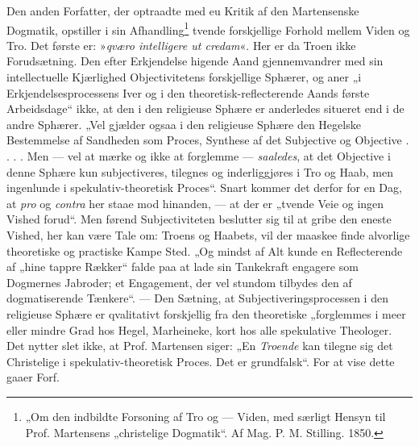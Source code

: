 \documentclass[12pt,a4paper]{book}
\newcommand{\opage}[1]{\marginnote{\footnotesize\textit{[#1]}}}
\begin{document}
\opage{28}\setcounter{footnote}{0}%
Den anden Forfatter, der optraadte med eu Kritik af den Martensenske Dogmatik, opstiller i sin Afhandling\footnote{„Om den indbildte Forsoning af Tro og --- Viden, med særligt Hensyn til Prof. Martensens „christelige Dogmatik“. Af Mag. P. M. Stilling. 1850.} tvende forskjellige Forhold mellem Viden og Tro. Det første er: »\emph{\textit{qværo intelligere ut credam}}«. Her er da Troen ikke Forudsætning. Den efter Erkjendelse higende Aand gjennemvandrer med sin intellectuelle Kjærlighed Objectivitetens forskjellige Sphærer, og aner „i Erkjendelsesprocessens Iver og i den theoretisk-reflecterende Aands første Arbeidsdage“ ikke, at den i den religieuse Sphære er anderledes situeret end i de andre Sphærer. „Vel gjælder ogsaa i den religieuse Sphære den Hegelske Bestemmelse af Sandheden som Proces, Synthese af det Subjective og Objective . . . . Men --- vel at mærke og ikke at forglemme --- \emph{saaledes}, at det Objective i denne Sphære kun subjectiveres, tilegnes og inderliggjøres i Tro og Haab, men ingenlunde i spekulativ-theoretisk Proces“. Snart kommer det derfor for en Dag, at \textit{pro} og \textit{contra} her staae mod hinanden, --- at der er „tvende Veie og ingen Vished forud“. Men førend Subjectiviteten beslutter sig til at gribe den eneste Vished, her kan være Tale om: Troens og Haabets, vil der maaskee finde alvorlige theoretiske og practiske Kampe Sted. „Og mindst af Alt kunde en Reflecterende af „hine tappre Rækker“ falde paa at lade sin Tankekraft engagere som Dogmernes Jabroder; et Engagement, der vel stundom tilbydes den af dogmatiserende Tænkere“. --- Den Sætning, at Subjectiveringsprocessen i den religieuse Sphære er qvalitativt forskjellig fra den theoretiske „forglemmes i meer eller mindre Grad hos Hegel, Marheineke, kort hos alle spekulative Theologer. Det nytter slet ikke, at Prof. Martensen siger: „En \emph{Troende} kan tilegne sig det Christelige i spekulativ-theoretisk Proces. Det er grundfalsk“. For at vise dette gaaer Forf.
\opage{29}\setcounter{footnote}{0}%
\end{document}
